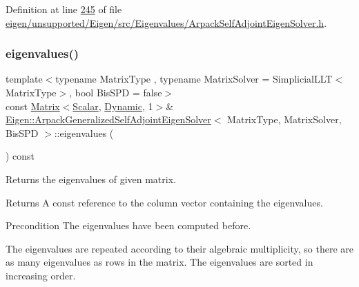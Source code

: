 Definition at line \hyperlink{eigen_2unsupported_2_eigen_2src_2_eigenvalues_2_arpack_self_adjoint_eigen_solver_8h_source_l00245}{245} of file \hyperlink{eigen_2unsupported_2_eigen_2src_2_eigenvalues_2_arpack_self_adjoint_eigen_solver_8h_source}{eigen/unsupported/\+Eigen/src/\+Eigenvalues/\+Arpack\+Self\+Adjoint\+Eigen\+Solver.\+h}.

\mbox{\label{class_eigen_1_1_arpack_generalized_self_adjoint_eigen_solver_ab46900dafdd11a8ac05a662c6b41480d}} 
\subsubsection{\texorpdfstring{eigenvalues()}{eigenvalues()}\hspace{0.1cm}{\footnotesize\ttfamily [2/2]}}
{\footnotesize\ttfamily template$<$typename Matrix\+Type , typename Matrix\+Solver  = Simplicial\+L\+L\+T$<$\+Matrix\+Type$>$, bool Bis\+S\+PD = false$>$ \\
const \hyperlink{group___core___module_class_eigen_1_1_matrix}{Matrix}$<$\hyperlink{class_eigen_1_1_arpack_generalized_self_adjoint_eigen_solver_ab1182405bfe87a505d4b7a8311c661ec}{Scalar}, \hyperlink{namespace_eigen_ad81fa7195215a0ce30017dfac309f0b2}{Dynamic}, 1$>$\& \hyperlink{class_eigen_1_1_arpack_generalized_self_adjoint_eigen_solver}{Eigen\+::\+Arpack\+Generalized\+Self\+Adjoint\+Eigen\+Solver}$<$ Matrix\+Type, Matrix\+Solver, Bis\+S\+PD $>$\+::eigenvalues (\begin{DoxyParamCaption}{ }\end{DoxyParamCaption}) const\hspace{0.3cm}{\ttfamily [inline]}}



Returns the eigenvalues of given matrix. 

\begin{DoxyReturn}{Returns}
A const reference to the column vector containing the eigenvalues.
\end{DoxyReturn}
\begin{DoxyPrecond}{Precondition}
The eigenvalues have been computed before.
\end{DoxyPrecond}
The eigenvalues are repeated according to their algebraic multiplicity, so there are as many eigenvalues as rows in the matrix. The eigenvalues are sorted in increasing order.

